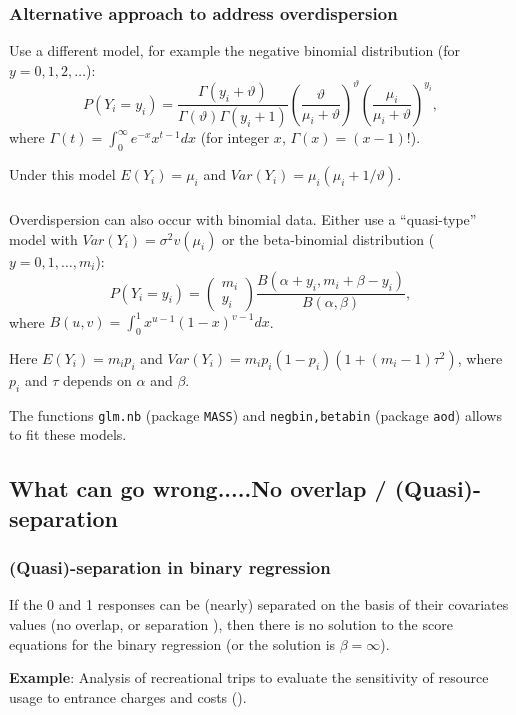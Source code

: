 \documentclass{beamer}
\newcommand{\bs}{\bigskip}
\begin{document}
\begin{frame}
\frametitle{Alternative approach to address overdispersion }

Use a different model,
for example the {\color{blue}negative binomial} distribution (for
$y=0,1,2,\dots$):
$$P(Y_i=y_i) = \frac {\Gamma(y_i+\vartheta)}{\Gamma(\vartheta)\Gamma(y_i+1)}\left(\frac{\vartheta}{\mu_i+\vartheta}\right)^\vartheta
\left(\frac{\mu_i}{\mu_i+\vartheta}\right)^{y_i},$$ 
where $\Gamma(t)= \int_0^{\infty} e^{-x} x^{t-1}dx$ (for integer $x$,
$\Gamma(x) = (x-1)!$).

Under this model $E(Y_i)= \mu_i$ and $Var(Y_i)= \mu_i(\mu_i+1/\vartheta)$.
\end{frame}

\begin{frame}
\frametitle{}

Overdispersion can also occur with  binomial data. Either use a
``quasi-type'' model with $Var(Y_i) = \sigma^2 v(\mu_i)$ or the
{\color{blue}beta-binomial} distribution ($y=0, 1, \ldots, m_i$):
$$P(Y_i=y_i) = \left(
\begin{array}{cc}
m_i\\
y_i
\end{array} \right) \frac{B(\alpha+y_i,m_i+\beta-y_i)}{B(\alpha,\beta)},$$
where $B(u,v) = \int_0^1 x^{u-1}(1-x)^{v-1}dx$.

\bs
Here $E(Y_i) = m_i p_i$ and $Var(Y_i) = m_i p_i (1-p_i) (1 + (m_i-1) \tau^2)$,
where $p_i$ and $\tau$ depends on $\alpha$ and $\beta$.

\bs
The functions \texttt{glm.nb} (package \texttt{MASS}) and
\texttt{negbin,betabin} (package \texttt{aod}) allows to fit these models.

\end{frame}

\subsection{What can go wrong.....No overlap / (Quasi)-separation}
\begin{frame}
\frametitle{(Quasi)-separation in binary regression}

If the 0 and 1 responses can be (nearly) separated on the basis of their
covariates values ({\color{blue}no overlap, or separation }), then there is no solution to the
score equations for the binary regression (or the solution is
$\beta=\infty$).

\bs
\textbf{Example}: Analysis of recreational trips to evaluate the sensitivity of
resource usage to entrance charges and costs ().
\end{frame}
\end{document}
